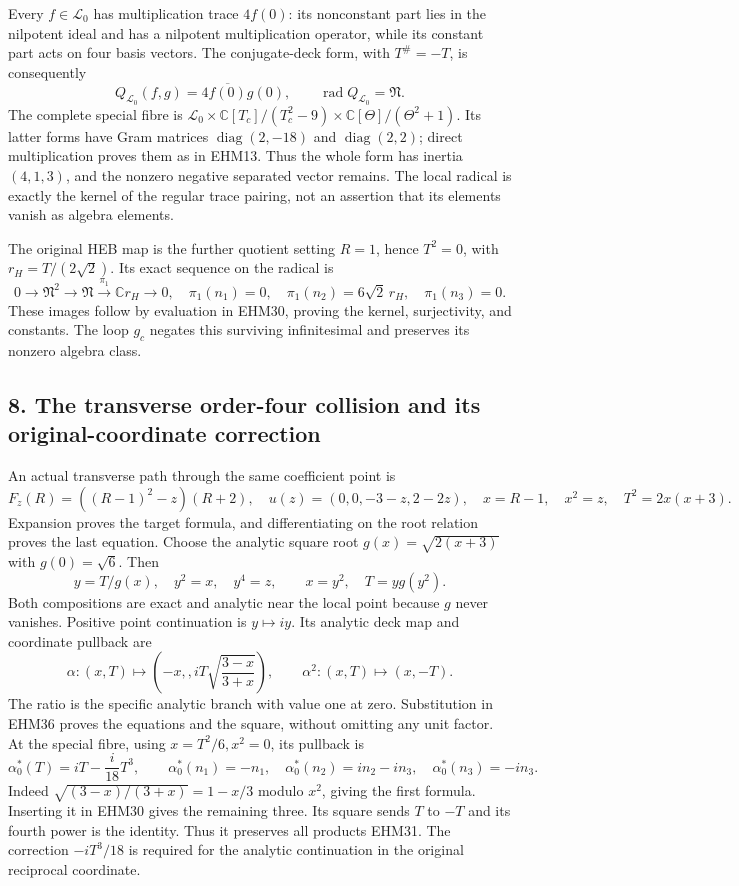 \documentclass[
  10pt,
  a4paper,
]{article}
\begin{document}
Every \(f\in\mathscr L_0\) has multiplication trace \(4f(0)\): its
nonconstant part lies in the nilpotent ideal and has a nilpotent
multiplication operator, while its constant part acts on four basis
vectors. The conjugate-deck form, with \(T^\#=-T\), is consequently \[
Q_{\mathscr L_0}(f,g)=4\overline{f(0)}g(0),\qquad
\operatorname{rad}Q_{\mathscr L_0}=\mathfrak N.
\tag{EHM33}
\] The complete special fibre is
\(\mathscr L_0\times\mathbb C[T_c]/(T_c^2-9)\times\mathbb C[\Theta]/(\Theta^2+1)\).
Its latter forms have Gram matrices \(\operatorname{diag}(2,-18)\) and
\(\operatorname{diag}(2,2)\); direct multiplication proves them as in
EHM13. Thus the whole form has inertia \((4,1,3)\), and the nonzero
negative separated vector remains. The local radical is exactly the
kernel of the regular trace pairing, not an assertion that its elements
vanish as algebra elements.

The original HEB map is the further quotient setting \(R=1\), hence
\(T^2=0\), with \(r_H=T/(2\sqrt2)\). Its exact sequence on the radical
is \[
0\longrightarrow\mathfrak N^2\longrightarrow\mathfrak N
\xrightarrow{\pi_1}\mathbb Cr_H\longrightarrow0,
\quad\pi_1(n_1)=0,\quad\pi_1(n_2)=6\sqrt2\,r_H,\quad\pi_1(n_3)=0.
\tag{EHM34}
\] These images follow by evaluation in EHM30, proving the kernel,
surjectivity, and constants. The loop \(g_c\) negates this surviving
infinitesimal and preserves its nonzero algebra class.

\subsection{8. The transverse order-four collision and its
original-coordinate
correction}\label{the-transverse-order-four-collision-and-its-original-coordinate-correction}

An actual transverse path through the same coefficient point is \[
F_z(R)=((R-1)^2-z)(R+2),\quad
u(z)=(0,0,-3-z,2-2z),\quad
x=R-1,\quad x^2=z,\quad T^2=2x(x+3).
\tag{EHM35}
\] Expansion proves the target formula, and differentiating on the root
relation proves the last equation. Choose the analytic square root
\(g(x)=\sqrt{2(x+3)}\) with \(g(0)=\sqrt6\). Then \[
y=T/g(x),\quad y^2=x,\quad y^4=z,
\qquad x=y^2,\quad T=yg(y^2).
\tag{EHM36}
\] Both compositions are exact and analytic near the local point because
\(g\) never vanishes. Positive point continuation is \(y\mapsto iy\).
Its analytic deck map and coordinate pullback are \[
\alpha:(x,T)\longmapsto\left(-x,,iT\sqrt{\frac{3-x}{3+x}}\right),
\qquad \alpha^2:(x,T)\longmapsto(x,-T).
\tag{EHM37}
\] The ratio is the specific analytic branch with value one at zero.
Substitution in EHM36 proves the equations and the square, without
omitting any unit factor. At the special fibre, using \(x=T^2/6,x^2=0\),
its pullback is \[
\alpha_0^*(T)=iT-\frac{i}{18}T^3,\qquad
\alpha_0^*(n_1)=-n_1,\quad
\alpha_0^*(n_2)=in_2-in_3,\quad
\alpha_0^*(n_3)=-in_3.
\tag{EHM38}
\] Indeed \(\sqrt{(3-x)/(3+x)}=1-x/3\) modulo \(x^2\), giving the first
formula. Inserting it in EHM30 gives the remaining three. Its square
sends \(T\) to \(-T\) and its fourth power is the identity. Thus it
preserves all products EHM31. The correction \(-iT^3/18\) is required
for the analytic continuation in the original reciprocal coordinate.
\end{document}
